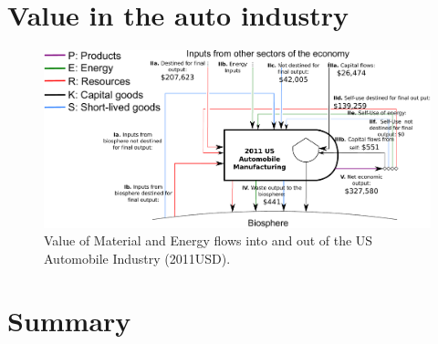 \section{Value in the auto industry}
\label{sec:value_auto}

\begin{figure}[h!]
\centering
\includegraphics[width=1.0\linewidth]{Part_3/Chapter_Values/images/PERKS_basic_unit_value_auto_ind.pdf}
\caption{Value of Material and Energy flows into and out of the US Automobile Industry (2011USD).}
\label{fig:PERKS_value_auto_ind}
\end{figure}

\section{Summary}
\label{sec:value_summary}







%
%

